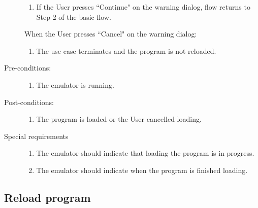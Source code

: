 \documentclass[12pt]{article}
\begin{document}
\begin{description}
\begin{enumerate}
			\item{If the User presses ``Continue" on the warning dialog, flow returns to Step 2 of the basic flow.}
		\end{enumerate}
	When the User presses ``Cancel" on the warning dialog:
        \begin{enumerate}
          \item{The use case terminates and the program is not reloaded.}
        \end{enumerate}
      \item[Pre-conditions:] \hfill
        \begin{enumerate}
          \item{The emulator is running.}
        \end{enumerate}
      \item[Post-conditions:] \hfill
        \begin{enumerate}
	  \item{The program is loaded or the User cancelled loading.}
        \end{enumerate}
      \item[Special requirements] \hfill
        \begin{enumerate}
          \item{The emulator should indicate that loading the program is in progress.}
          \item{The emulator should indicate when the program is finished loading.}
        \end{enumerate}
    \end{description}
\newpage
  \subsection{Reload program}
\end{document}
